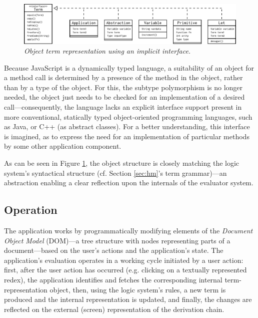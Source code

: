 \documentclass[table, a4paper, 10pt]{article}
\begin{document}
\begin{figure}[H]\centering
\includegraphics[scale=0.64]{termUML.pdf}
\caption{\textit{Object term representation using an implicit interface.}}\label{termuml}
\end{figure}

\noindent
Because JavaScript is a dynamically typed language, a suitability of an object
for a method call
is determined by a presence of the method in the object, rather than by a type of the object.
For this, the subtype polymorphism is no longer needed, the object just needs to be 
checked for an implementation of a desired call---consequently, the language
lacks an explicit interface support present in more conventional,
statically typed object-oriented programming languages, such as
Java, or C++ (as abstract classes). For a better understanding, this interface is imagined, as to
express the need for an implementation of particular methods by some other
application component.

As can be seen in Figure \ref{termuml}, the object structure is closely matching the logic system's
syntactical structure (cf. Section \ref{sec:hm}'s term grammar)---an abstraction enabling
a clear reflection upon the internals of the evaluator system.

\subsection{Operation}
The application works by programmatically modifying
elements of the \textit{Document Object Model} (DOM)---a tree
structure with nodes representing parts of a document---based
on the user's actions and the application's state. The application's evaluation
operates in a working cycle initiated by a user action:
first, after the user action has
occurred (e.g. clicking on a textually represented redex), the application
identifies and fetches the corresponding internal term-representation object,
then, using the logic system's rules, a new term is produced and the
internal representation is updated, and finally, the changes are reflected
on the external (screen) representation of the derivation chain.
\end{document}
